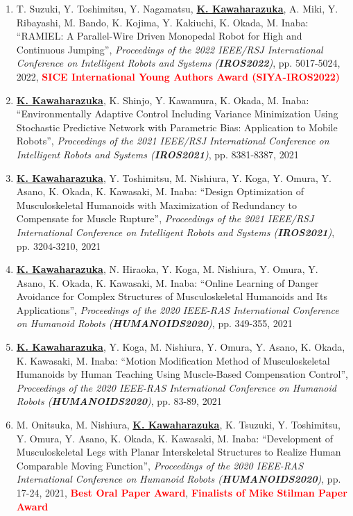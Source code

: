 \documentclass[letterpaper]{article}
\begin{document}
\begin{enumerate}
\item T. Suzuki, Y. Toshimitsu, Y. Nagamatsu, \underline{\textbf{K. Kawaharazuka}}, A. Miki, Y. Ribayashi, M. Bando, K. Kojima, Y. Kakiuchi, K. Okada, M. Inaba: ``RAMIEL: A Parallel-Wire Driven Monopedal Robot for High and Continuous Jumping'', \textit{Proceedings of the 2022 IEEE/RSJ International Conference on Intelligent Robots and Systems (\textit{\textbf{IROS2022}})}, pp. 5017-5024, 2022, \textbf{\textcolor{red}{SICE International Young Authors Award (SIYA-IROS2022)}}
\item \underline{\textbf{K. Kawaharazuka}}, K. Shinjo, Y. Kawamura, K. Okada, M. Inaba: ``Environmentally Adaptive Control Including Variance Minimization Using Stochastic Predictive Network with Parametric Bias: Application to Mobile Robots'', \textit{Proceedings of the 2021 IEEE/RSJ International Conference on Intelligent Robots and Systems (\textit{\textbf{IROS2021}})}, pp. 8381-8387, 2021
\item \underline{\textbf{K. Kawaharazuka}}, Y. Toshimitsu, M. Nishiura, Y. Koga, Y. Omura, Y. Asano, K. Okada, K. Kawasaki, M. Inaba: ``Design Optimization of Musculoskeletal Humanoids with Maximization of Redundancy to Compensate for Muscle Rupture'', \textit{Proceedings of the 2021 IEEE/RSJ International Conference on Intelligent Robots and Systems (\textit{\textbf{IROS2021}})}, pp. 3204-3210, 2021
\item \underline{\textbf{K. Kawaharazuka}}, N. Hiraoka, Y. Koga, M. Nishiura, Y. Omura, Y. Asano, K. Okada, K. Kawasaki, M. Inaba: ``Online Learning of Danger Avoidance for Complex Structures of Musculoskeletal Humanoids and Its Applications'', \textit{Proceedings of the 2020 IEEE-RAS International Conference on Humanoid Robots (\textit{\textbf{HUMANOIDS2020}})}, pp. 349-355, 2021
\item \underline{\textbf{K. Kawaharazuka}}, Y. Koga, M. Nishiura, Y. Omura, Y. Asano, K. Okada, K. Kawasaki, M. Inaba: ``Motion Modification Method of Musculoskeletal Humanoids by Human Teaching Using Muscle-Based Compensation Control'', \textit{Proceedings of the 2020 IEEE-RAS International Conference on Humanoid Robots (\textit{\textbf{HUMANOIDS2020}})}, pp. 83-89, 2021
\item M. Onitsuka, M. Nishiura, \underline{\textbf{K. Kawaharazuka}}, K. Tsuzuki, Y. Toshimitsu, Y. Omura, Y. Asano, K. Okada, K. Kawasaki, M. Inaba: ``Development of Musculoskeletal Legs with Planar Interskeletal Structures to Realize Human Comparable Moving Function'', \textit{Proceedings of the 2020 IEEE-RAS International Conference on Humanoid Robots (\textit{\textbf{HUMANOIDS2020}})}, pp. 17-24, 2021, \textbf{\textcolor{red}{Best Oral Paper Award}}, \textbf{\textcolor{red}{Finalists of Mike Stilman Paper Award}}

\end{enumerate}
\end{document}
